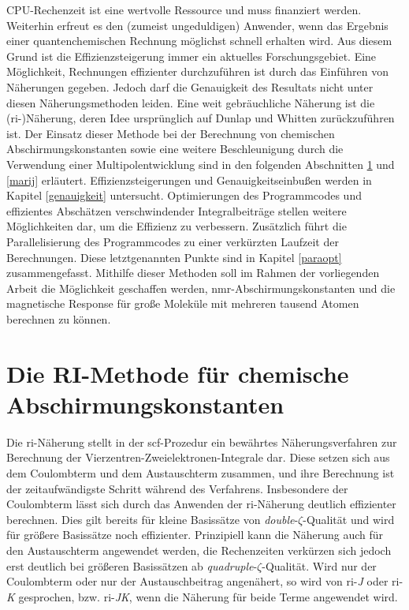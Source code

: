 CPU-Rechenzeit ist eine wertvolle Ressource und muss finanziert werden. Weiterhin erfreut es den (zumeist ungeduldigen) Anwender, wenn das Ergebnis einer quantenchemischen Rechnung möglichst schnell erhalten wird. Aus diesem Grund ist die Effizienzsteigerung immer ein aktuelles Forschungsgebiet. Eine Möglichkeit, Rechnungen effizienter durchzuführen ist durch das Einführen von Näherungen gegeben. Jedoch darf die Genauigkeit des Resultats nicht unter diesen Näherungsmethoden leiden. Eine weit gebräuchliche Näherung ist die \mbox{(\acs{ri}-)}Näherung\supercite{vahtras1993integral}, deren Idee ursprünglich auf Dunlap\supercite{dunlap1979some} und Whitten\supercite{whitten1973coulombic} zurückzuführen ist. Der Einsatz dieser Methode bei der Berechnung von chemischen Abschirmungskonstanten sowie eine weitere Beschleunigung durch die Verwendung einer Multipolentwicklung sind in den folgenden Abschnitten \ref{ri} und \ref{marij} erläutert. Effizienzsteigerungen und Genauigkeitseinbußen werden in Kapitel \ref{genauigkeit} untersucht. Optimierungen des Programmcodes und effizientes Abschätzen verschwindender Integralbeiträge stellen weitere Möglichkeiten dar, um die Effizienz zu verbessern. Zusätzlich führt die Parallelisierung des Programmcodes zu einer verkürzten Laufzeit der Berechnungen. Diese letztgenannten Punkte sind in Kapitel \ref{paraopt} zusammengefasst. 
Mithilfe dieser Methoden soll im Rahmen der vorliegenden Arbeit die Möglichkeit geschaffen werden, \ac{nmr}-Abschirmungskonstanten und die magnetische Response für große Moleküle mit mehreren tausend Atomen berechnen zu können.  

\section{Die RI-Methode für chemische Abschirmungskonstanten}\label{ri}
Die \acl{ri}-Näherung stellt in der \ac{scf}-Prozedur ein bewährtes Näherungsverfahren zur Berechnung der Vierzentren-Zweielektronen-Integrale dar. Diese setzen sich aus dem Coulombterm und dem Austauschterm zusammen, und ihre Berechnung ist der zeitaufwändigste Schritt während des Verfahrens. Insbesondere der Coulombterm lässt sich durch das Anwenden der \ac{ri}-Näherung deutlich effizienter berechnen. Dies gilt bereits für kleine Basissätze von \textit{double}-$\zeta$-Qualität und wird für größere Basissätze noch effizienter. Prinzipiell kann die Näherung auch für den Austauschterm angewendet werden, die Rechenzeiten verkürzen sich jedoch erst deutlich bei größeren Basissätzen ab \textit{quadruple}-$\zeta$-Qualität. Wird nur der Coulombterm oder nur der Austauschbeitrag angenähert, so wird von \ac{ri}-\textit{J} oder \ac{ri}-\textit{K} gesprochen, bzw. \ac{ri}-\textit{JK}, wenn die Näherung für beide Terme angewendet wird. 

